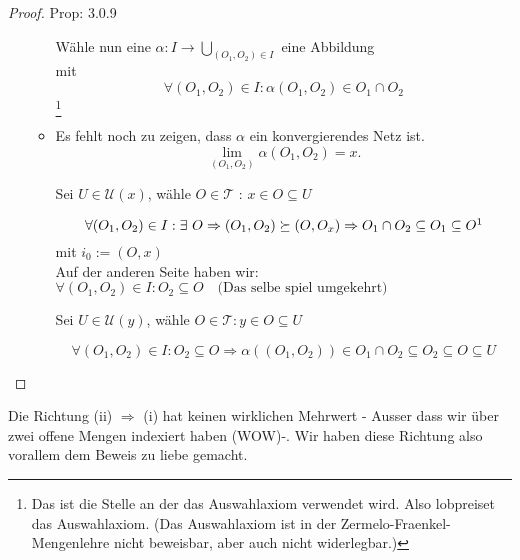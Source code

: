 \begin{proof}{Prop: 3.0.9}
\begin{itemize}
\begin{itemize}
    Wähle nun eine $\alpha : I \to \underset{(O_1, O_2) \in I}{\bigcup}$  eine Abbildung \\
    mit 
    $$
    \forall (O_1, O_2) \in I :\alpha(O_1, O_2) \in O_1 \cap O_2
    $$
    \footnote{Das ist die Stelle an der das Auswahlaxiom verwendet wird. Also lobpreiset das Auswahlaxiom.
    (Das Auswahlaxiom ist in der Zermelo-Fraenkel-Mengenlehre nicht beweisbar, aber auch nicht widerlegbar.)}

    \item Es fehlt noch zu zeigen, dass $\alpha$ ein konvergierendes Netz ist.\\
    $$
    \lim_{(O_1,O_2)} \alpha(O_1,O_2) = x .
    $$

    Sei $U \in \mathscr{U}(x)$, wähle $O \in \mathcal{T}$ : $x \in O \subseteq U$

    $$
    \forall (O_1, O_2) \in I : \exists \ O \Rightarrow (O_1, O_2) \succeq (O, O_x) 
    \Rightarrow O_1 \cap O_2 \subseteq O_1 \subseteq O \footnote{Das geht wegen dem Auswahl axiom}
    $$
    mit $i_0 := (O, x)$\\
    Auf der anderen Seite haben wir: \\
    $\forall (O_1, O_2) \in I : O_2 \subseteq O 
    \quad \text{(Das selbe spiel umgekehrt)} $

    Sei $U \in \mathscr{U}(y)$, wähle $O \in \mathcal{T} : y \in O \subseteq U$

    $$
    \forall (O_1, O_2) \in I : O_2 \subseteq O 
    \Rightarrow \alpha((O_1, O_2)) \in O_1 \cap O_2 \subseteq O_2 \subseteq O \subseteq U
    $$

\end{itemize}
\end{itemize}
\end{proof}

Die Richtung (ii) $\Rightarrow$ (i) hat keinen wirklichen 
Mehrwert - Ausser dass wir über zwei offene Mengen indexiert haben (WOW)-.
Wir haben diese Richtung also vorallem dem Beweis zu liebe gemacht.
